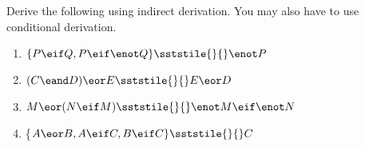 \noindent\problempart Derive the following using indirect derivation. You may also have to use conditional derivation.
\begin{enumerate}[label=(\arabic*)]

\item $\{P \eif Q, P \eif \enot Q\} \sststile{}{} \enot P$


\item $(C\eand D)\eor E \sststile{}{} E\eor D$


\item $M\eor(N\eif M) \sststile{}{} \enot M \eif \enot N$ \label{DeM4}




\item \label{itm:const_d} \{$A \eor B, A \eif C, B \eif C\} \sststile{}{} C$



\end{enumerate}
